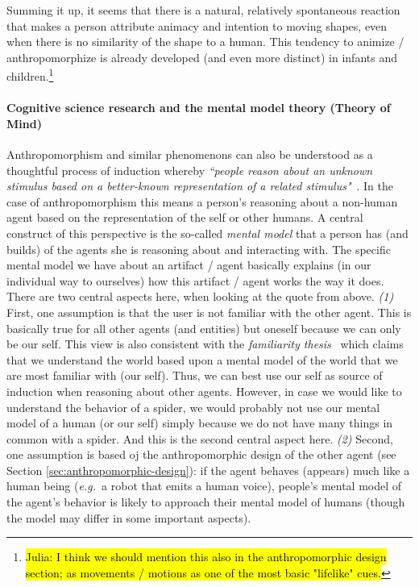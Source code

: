 \documentclass{frontiersSCNS} %
\newcommand{\eg}{{\textit{e.g.~}}}
\begin{document}
Summing it up, it seems that there is a natural, relatively spontaneous reaction that makes a person attribute animacy and intention to moving shapes, even when there is no similarity of the shape to a human. This tendency to animize / anthropomorphize is already developed (and even more distinct) in infants and children.\footnote{\hl{Julia: I think we should mention this also in the anthropomorphic design section; as movements / motions as one of the most basic "lifelike" cues.}}


\paragraph*{Cognitive science research and the mental model theory (Theory of Mind)\\}

Anthropomorphism and similar phenomenons can also be understood as a thoughtful process of induction whereby \textit{``people reason about an unknown stimulus based on a better-known representation of a related stimulus"}~\citep{epley_when_2008}. In the case of anthropomorphism this means a person's reasoning about a non-human agent based on the representation of the self or other humans. A central construct of this perspective is the so-called \textit{mental model} that a person has (and builds) of the agents she is reasoning about and interacting with. The specific mental model we have about an artifact / agent basically explains (in our individual way to ourselves) how this artifact / agent works the way it does.
There are two central aspects here, when looking at the quote from \citep{epley_when_2008} above.
\textit{(1)} First, one assumption is that the user is not familiar with the other agent. This is basically true for all other agents (and entities) but oneself because we can only be our self. This view is also consistent with the \emph{familiarity thesis}~\citep{hegel_understanding_2008} which claims that we understand the world based upon a mental model of the world that we are most familiar with (our self). Thus, we can best use our self as source of induction when reasoning about other agents. However, in case we would like to understand the behavior of a spider, we would probably not use our mental model of a human (or our self) simply because we do not have many things in common with a spider. And this is the second central aspect here.
\textit{(2)} Second, one assumption is based oj the anthropomorphic design of the other agent (see Section \ref{sec:anthropomorphic-design}): if the agent behaves (appears) much like a human being (\eg a robot that emits a human voice), people's mental model of the agent's behavior is likely to approach their mental model of humans (though the model may differ in some important aspects).
\end{document}
